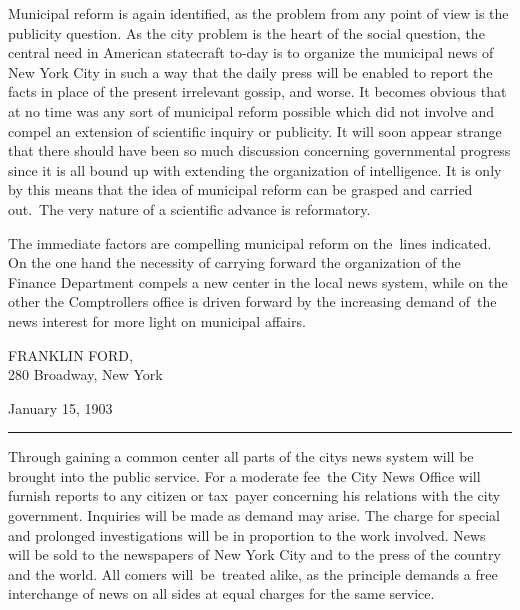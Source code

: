 \documentclass[twoside,symmetric,nobib,justified]{tufte-book}
\begin{document}
Municipal reform is again identified, as the problem from any point of
view is the publicity question. As the city problem is the heart of the
social question, the central need in American statecraft to-day is to
organize the municipal news of New York City in such a way that the
daily press will be enabled to report the facts in place of the present
irrelevant gossip, and worse. It becomes obvious that at no time was any
sort of municipal reform possible which did not involve and compel an
extension of scientific inquiry or publicity. It will soon appear
strange that there should have been so much discussion concerning
governmental progress since it is all bound up with extending the
organization of intelligence. It is only by this means that the idea of
municipal reform can be grasped and carried out.~The very nature of a
scientific advance is reformatory.~~


The immediate factors are compelling municipal reform on the~lines
indicated. On the one hand the necessity of carrying forward the
organization of the Finance Department compels a new center in the local
news system, while on the other the Comptroller\textquotesingle s office
is driven forward by the increasing demand of~the news interest for more
light on municipal affairs.~

\vspace{0.15in}

\hfill{\large FRANKLIN FORD},\\
\hfill 280 Broadway, New York

\vspace{0.1in}

January 15, 1903

\begin{center}
\vspace{0.15in}
\noindent\rule{2in}{0.5pt} 
\vspace{0.15in}
\end{center}

\noindent Through gaining a common center all parts of the city\textquotesingle s
news system will be brought into the public service. For a moderate
fee~the City News Office will furnish reports to any citizen or
tax~payer concerning his relations with the city government. Inquiries
will be made as demand may arise. The charge for special and prolonged
investigations will be in proportion to the work involved. News will be
sold to the newspapers of New York City and to the press of the country
and the world. All comers will~be~treated alike, as the principle
demands a free interchange of news on all sides at equal charges for the
same service.~
\end{document}

